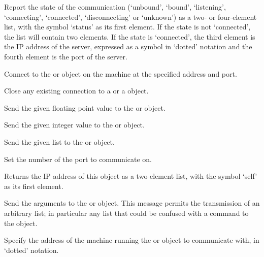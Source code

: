 


\objItemCommands[]

  \objListCmdBegin

  Report the state of the communication (`unbound', `bound', `listening', `connecting',
  `connected', `disconnecting' or `unknown') as a two- or four-element list, with the symbol
  `status' as its first element.
  If the state is not `connected', the list will contain two elements.
  If the state is `connected', the third element is the IP address of the server, expressed as a
  symbol in `dotted' notation and the fourth element is the port of the server.

  Connect to the  or  object on the machine at the
  specified address and port.

  Close any existing connection to a  or a  object.

  Send the given floating point value to the  or  object.

  Send the given integer value to the  or  object.

  Send the given list to the  or  object.

  Set the number of the port to communicate on.

  Returns the IP address of this object as a two-element list, with the symbol `self' as its first
  element.
  
  Send the arguments to the  or  object.
  This message permits the transmission of an arbitrary list; in particular any list that could be
  confused with a command to the  object.

  Specify the address of the machine running the  or 
  object to communicate with, in `dotted' notation.

